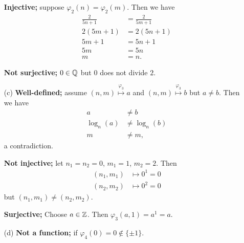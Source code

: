\documentclass[../UNABRIDGEDalgebraNotesMSRI-UP2016.tex]{subfiles}
\begin{document}
\begin{frame}
\begin{itemize}
\item[] \textbf{Injective;} suppose $\varphi_2(n)=\varphi_2(m)$.  Then we have
\begin{align*}
{\textstyle\frac{2}{5n+1}} &= \textstyle{\frac{2}{5m+1}} \\
2(5m+1) &= 2(5n+1) \\
5m+1 &= 5n+1 \\
5m &= 5n \\
m &= n.
\end{align*}

\smallGap
\textbf{Not surjective;} $0\in \mathbb Q$ but $0$ does not divide $2$.

\smallGap
\item[(c)] \textbf{Well-defined;} assume $(n,m)\overset{\varphi_3}{\longmapsto}a$ and $(n,m)\overset{\varphi_3}{\longmapsto}b$ but $a\neq b$.  Then we have 
\begin{align*}
a &\neq b \\
\log_n(a) &\neq \log_n(b) \\
m &\neq m,
\end{align*}
a contradiction.
\end{itemize}
\end{frame}

\begin{frame}
\begin{itemize}
\item[] \textbf{Not injective;} let $n_1=n_2=0$, $m_1=1$, $m_2=2$.  Then
\begin{align*}
(n_1,m_1) &\mapsto 0^1=0 \\
(n_2,m_2) &\mapsto 0^2=0
\end{align*}
but $(n_1,m_1)\neq (n_2,m_2)$.

\smallGap
\textbf{Surjective;} Choose $a\in\mathbb Z$.  Then $\varphi_3(a,1)=a^1=a$.  

\smallGap
\item[(d)] \textbf{Not a function;} if $\varphi_4(0)=0\notin\{\pm 1\}$.
\end{itemize}
\end{frame}
\end{document}
